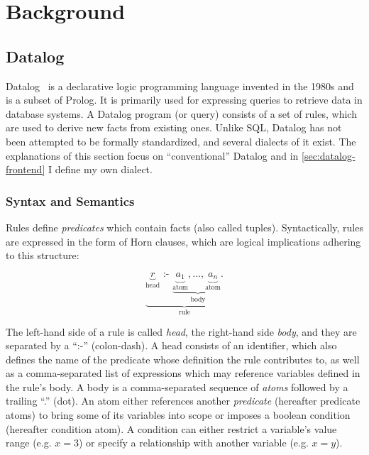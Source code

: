 
\chapter{Background}\label{ch:background}

\section{Datalog}\label{sec:datalog}

Datalog~\cite{green2013datalog} is a declarative logic programming language
invented in the 1980s and is a subset of Prolog.
It is primarily used for expressing queries to retrieve data in database systems.
A Datalog program (or query) consists of a set of rules,
which are used to derive new facts from existing ones.
Unlike SQL, Datalog has not been attempted to be formally standardized,
and several dialects of it exist.
The explanations of this section focus on ``conventional'' Datalog
and in \ref{sec:datalog-frontend} I define my own dialect.

\subsection{Syntax and Semantics}\label{sec:datalog-syntax-semantics}

Rules define \emph{predicates} which contain facts (also called tuples).
Syntactically, rules are expressed in the form of Horn clauses,
which are logical implications adhering to this structure:

\begin{equation}
    \underbrace{
    \underbrace{r}_{\text{head}}
    \text{ :- }
    \underbrace{
    \underbrace{a_1}_{\text{atom}},
    \ldots,
    \underbrace{a_n}_{\text{atom}}.
    }_{\text{body}}
    }_{\text{rule}}
\end{equation}

The left-hand side of a rule is called \emph{head}, the right-hand side \emph{body},
and they are separated by a ``:-'' (colon-dash).
A head consists of an identifier, which also defines the name of the predicate
whose definition the rule contributes to, as well as a comma-separated list of expressions
which may reference variables defined in the rule's body.
A body is a comma-separated sequence of \emph{atoms} followed by a trailing ``.'' (dot).
An atom either references another \emph{predicate} (hereafter predicate atoms)
to bring some of its variables into scope or imposes a boolean condition
(hereafter condition atom).
A condition can either restrict a variable's value range (e.g. \(x = 3\))
or specify a relationship with another variable (e.g. \(x = y\)).

